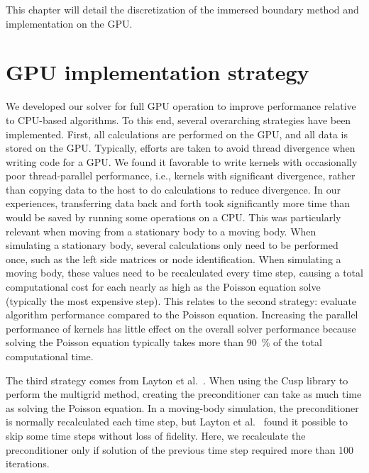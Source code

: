 \documentclass[onehalf,11pt]{beavtex}
\begin{document}
This chapter will detail the discretization of the immersed boundary method and implementation on the GPU. 

\section{GPU implementation strategy}
\label{GPU implementation strategy}

We developed our solver for full GPU operation to improve performance relative to CPU-based algorithms.
To this end, several overarching strategies have been implemented.
First, all calculations are performed on the GPU, and all data is stored on the GPU.
Typically, efforts are taken to avoid thread divergence when writing code for a GPU.
We found it favorable to write kernels with occasionally poor thread-parallel performance, i.e., kernels with significant divergence, rather than copying data to the host to do calculations to reduce divergence.
In our experiences, transferring data back and forth took significantly more time than would be saved by running some operations on a CPU.
This was particularly relevant when moving from a stationary body to a moving body.
When simulating a stationary body, several calculations only need to be performed once, such as the left side matrices or node identification.
When simulating a moving body, these values need to be recalculated every time step, causing a total computational cost for each nearly as high as the Poisson equation solve (typically the most expensive step).
This relates to the second strategy: evaluate algorithm performance compared to the Poisson equation.
Increasing the parallel performance of kernels has little effect on the overall solver performance because solving the Poisson equation typically takes more than \SI{90}{\percent} of the total computational time.

The third strategy comes from Layton et al.~\cite{layton2011cuibm}.
When using the Cusp library to perform the multigrid method, creating the preconditioner can take as much time as solving the Poisson equation.
In a moving-body simulation, the preconditioner is normally recalculated each time step, but Layton et al.~\cite{layton2011cuibm} found it possible to skip some time steps without loss of fidelity.
Here, we recalculate the preconditioner only if solution of the previous time step required more than 100 iterations.
\end{document}
